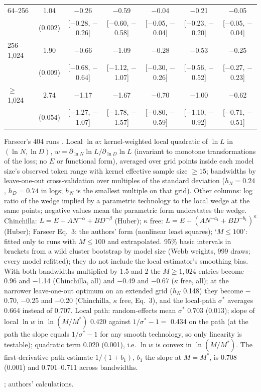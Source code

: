 \begin{table}[tp]
\begin{tabular*}{\textwidth}{@{\extracolsep{\fill}}lcccccc@{}}
64--256 & 1.04 & $-$0.26 & $-$0.59 & $-$0.04 & $-$0.21 & $-$0.05 \\
 & (0.002) & [$-$0.28, $-$0.26] & [$-$0.60, $-$0.58] & [$-$0.05, $-$0.04] & [$-$0.23, $-$0.20] & [$-$0.05, $-$0.04] \\
256--1,024 & 1.90 & $-$0.66 & $-$1.09 & $-$0.28 & $-$0.53 & $-$0.25 \\
 & (0.009) & [$-$0.68, $-$0.64] & [$-$1.12, $-$1.07] & [$-$0.30, $-$0.26] & [$-$0.56, $-$0.52] & [$-$0.27, $-$0.23] \\
$\ge$1,024 & 2.74 & $-$1.17 & $-$1.67 & $-$0.70 & $-$1.00 & $-$0.62 \\
 & (0.054) & [$-$1.27, $-$1.07] & [$-$1.78, $-$1.57] & [$-$0.80, $-$0.59] & [$-$1.10, $-$0.92] & [$-$0.71, $-$0.51] \\
\bottomrule
\end{tabular*}

\begin{tablenotes}
Farseer's 404 runs \citep{li2025predictableb}. Local $\ln w$: kernel-weighted local quadratic of $\ln L$ in $(\ln N,\ln D)$, $w=\partial_{\ln N}\ln L/\partial_{\ln D}\ln L$ (invariant to monotone transformations of the loss; no $E$ or functional form), averaged over grid points inside each model size's observed token range with kernel effective sample size $\ge15$; bandwidths by leave-one-out cross-validation over multiples of the standard deviation ($h_N=0.24$, $h_D=0.74$ in logs; $h_N$ is the smallest multiple on that grid). Other columns: log ratio of the wedge implied by a parametric technology to the local wedge at the same points; negative values mean the parametric form understates the wedge. Chinchilla: $L=E+AN^{-\alpha}+BD^{-\beta}$ (Huber); $\kappa$ free: $L=E+(AN^{-a_1}+BD^{-b_1})^\kappa$ (Huber); Farseer Eq.~3: the authors' form (nonlinear least squares); `$M\le100$': fitted only to runs with $M\le100$ and extrapolated. 95\% basic intervals in brackets from a wild cluster bootstrap by model size (Webb weights, 999 draws; every model refitted); they do not include the local estimator's smoothing bias. With both bandwidths multiplied by 1.5 and 2 the $M\ge1{,}024$ entries become $-$0.96 and $-$1.14 (Chinchilla, all) and $-$0.49 and $-$0.67 ($\kappa$ free, all); at the narrower leave-one-out optimum on an extended grid ($h_N$ 0.148) they become $-$0.70, $-$0.25 and $-$0.20 (Chinchilla, $\kappa$ free, Eq.~3), and the local-path $\sigma^*$ averages 0.664 instead of 0.707. Local path: random-effects mean $\sigma^*$ 0.703 (0.013); slope of local $\ln w$ in $\ln(M/M^*)$ 0.420 against $1/\sigma^*-1=$ 0.434 on the path (at the path the slope equals $1/\sigma^*-1$ for any smooth technology, so only linearity is testable); quadratic term 0.020 (0.001), i.e. $\ln w$ is convex in $\ln(M/M^*)$. The first-derivative path estimate $1/(1+b_1)$, $b_1$ the slope at $M=M^*$, is 0.708 (0.001) and 0.701--0.711 across bandwidths.
\end{tablenotes}

\begin{tablenotes}[Source]
\citet{li2025predictableb}; authors' calculations.
\end{tablenotes}
\end{table}
